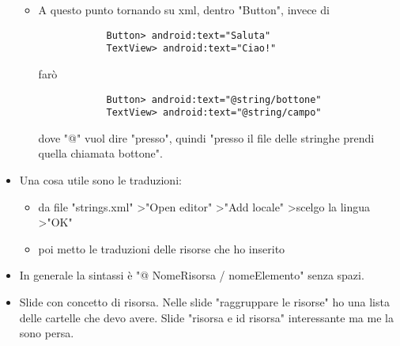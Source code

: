\begin{itemize}
\begin{itemize}
        \item A questo punto tornando su xml, dentro "Button", invece di 
        \begin{verbatim}
            Button> android:text="Saluta"
            TextView> android:text="Ciao!"
        \end{verbatim}
        farò
        \begin{verbatim}
            Button> android:text="@string/bottone"
            TextView> android:text="@string/campo"
        \end{verbatim}
        dove "@" vuol dire "presso", quindi "presso il file delle stringhe prendi quella chiamata bottone".\\
        
    \end{itemize}
    \item Una cosa utile sono le traduzioni: 
    \begin{itemize}
        \item da file "strings.xml" \textgreater "Open editor" \textgreater "Add locale" \textgreater scelgo la lingua \textgreater "OK"
        \item poi metto le traduzioni delle risorse che ho inserito
    \end{itemize}
    \item In generale la sintassi è "@ NomeRisorsa / nomeElemento" senza spazi.
    \item Slide con concetto di risorsa. Nelle slide "raggruppare le risorse" ho una lista delle cartelle che devo avere. Slide "risorsa e id risorsa" interessante ma me la sono persa.
\end{itemize} 
